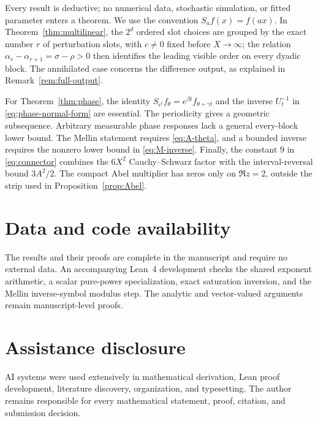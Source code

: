 \documentclass[11pt,a4paper]{amsart}
\theoremstyle{definition}
\begin{document}
Every result is deductive; no numerical data, stochastic simulation, or fitted
parameter enters a theorem.  We use the convention $S_af(x)=f(ax)$.  In
Theorem~\ref{thm:multilinear}, the $2^d$ ordered slot choices are grouped by
the exact number $r$ of perturbation slots, with $c\ne0$ fixed before
$X\to\infty$; the relation
$\alpha_r-\alpha_{r+1}=\sigma-\rho>0$ then identifies the leading visible
order on every dyadic block.  The annihilated case concerns the difference
output, as explained in Remark~\ref{rem:full-output}.

For Theorem~\ref{thm:phase}, the identity
$S_{e^t}f_\theta=e^{\beta t}f_{\theta+\gamma t}$ and the inverse $U_t^{-1}$
in \eqref{eq:phase-normal-form} are essential.  The periodicity gives a
geometric subsequence.  Arbitrary measurable phase responses lack a general
every-block lower bound.  The Mellin statement requires \eqref{eq:A-theta}, and a bounded
inverse requires the nonzero lower bound in \eqref{eq:M-inverse}.  Finally,
the constant $9$ in \eqref{eq:connector} combines the $6X^2$ Cauchy--Schwarz
factor with the interval-reversal bound $3A^2/2$.  The compact Abel multiplier
has zeros only on $\Re z=2$, outside the strip used in
Proposition~\ref{prop:Abel}.

\section*{Data and code availability}

The results and their proofs are complete in the manuscript and require no
external data.  An accompanying Lean~4 development checks the shared exponent
arithmetic, a scalar pure-power specialization, exact saturation inversion,
and the Mellin inverse-symbol modulus step.  The analytic and vector-valued
arguments remain manuscript-level proofs.

\section*{Assistance disclosure}

AI systems were used extensively in mathematical derivation, Lean proof
development, literature discovery, organization, and typesetting.  The author
remains responsible for every mathematical statement, proof, citation, and
submission decision.

\begingroup
\raggedright


\endgroup
\end{document}
